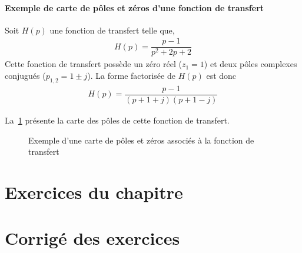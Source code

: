 \paragraph{Exemple de carte de pôles et zéros d'une fonction de transfert}

Soit $H(p)$ une fonction de transfert telle que,
\begin{align}
H(p)=\dfrac{p-1}{p^2+2p+2}\label{eq-ft_carte}
\end{align}
Cette fonction de transfert possède un zéro réel ($z_1=1$) et deux 
pôles complexes conjugués ($p_{1,2}=1\pm j$).
La forme factorisée de $H(p)$ est donc
\begin{align} 
    H(p)=\dfrac{p-1}{(p+1+j)(p+1-j)}
\end{align}

La~\cref{fig-carte} présente la carte des pôles de cette fonction de transfert.
\begin{figure}[!h]
    \begin{center}
    
\end{center}
\caption{Exemple d'une carte de pôles et zéros associés 
    à la fonction de transfert~\label{fig-carte} }
\end{figure}
\clearpage
\section{Exercices du chapitre}
\small


\setcounter{numexos}{0}
\normalsize
\newpage
\section{Corrigé des exercices}
\small

\normalsize
